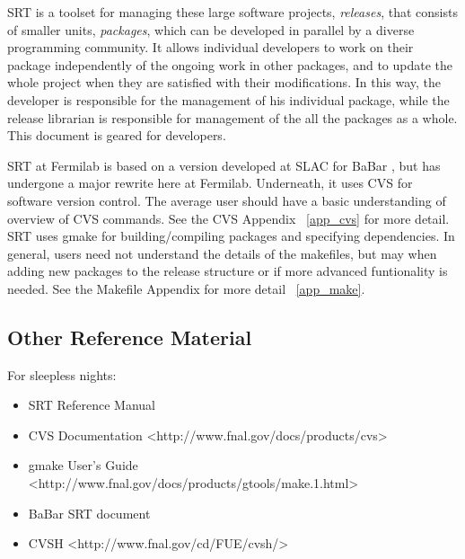 \documentclass[12pt]{article}
\begin{document}
SRT is a toolset for managing these large software projects, {\em releases},
that consists of smaller units, {\em packages}, 
 which can be developed in parallel
by a diverse programming community. It allows individual developers to 
work on their package independently of the ongoing work in other packages,
and to update the whole project when they are satisfied with their 
modifications. In this way, the developer 
 is responsible for the management
of his individual package, while the release librarian 
 is responsible for 
management of the all the packages as a whole.
This document is geared for developers. 

SRT at Fermilab is based on a version developed at SLAC for BaBar
, but has undergone a major rewrite here at Fermilab. 
Underneath, it uses CVS 
for software version control. 
The average user should have a basic understanding of overview of CVS commands. 
See the CVS Appendix ~\ref{app_cvs} for more detail. SRT uses gmake 
 for
building/compiling packages and specifying dependencies. 
In general, users need not understand the details of the makefiles, but 
may when adding new packages to the release structure or if
more advanced funtionality is needed. See the Makefile Appendix for more
detail ~\ref{app_make}. 

\subsection{Other Reference Material}

For sleepless nights:
\begin{itemize}
\item SRT Reference Manual
\item CVS Documentation <http://www.fnal.gov/docs/products/cvs>
\item gmake User's Guide <http://www.fnal.gov/docs/products/gtools/make.1.html>
\item BaBar SRT document
\item CVSH <http://www.fnal.gov/cd/FUE/cvsh/>
\end{itemize}

%
%
\end{document}
